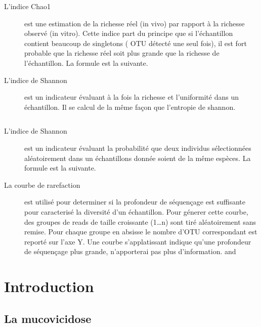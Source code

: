 \documentclass[12pt,a4paper]{article}
\begin{document}
\begin{description}
\item[L'indice Chao1] est une estimation de la richesse réel (in vivo) par rapport à la richesse observé (in vitro). Cette indice part du principe que si l’échantillon contient beaucoup de singletons ( OTU détecté une seul fois), il est fort probable que la richesse réel soit plus grande que la richesse de l’échantillon. La formule est la suivante.
\begin{equation}
\end{equation}

\item[L'indice de Shannon] est un indicateur évaluant à la fois la richesse et l’uniformité dans un échantillon. Il se calcul de la même façon que l’entropie de shannon.

\begin{equation}
\end{equation}

\item[L'indice de Shannon] est un indicateur évaluant la probabilité que deux individus sélectionnées aléatoirement dans un échantillons donnée soient de la même espèces. La formule est la suivante.

\item[La courbe de rarefaction] est utilisé pour determiner si la profondeur de séquençage est suffisante pour caracterisé la diversité d’un échantillon.
Pour génerer cette courbe, des groupes de reads de taille croissante (1…n) sont tiré aléatoirement sans remise. Pour chaque groupe en absisse le nombre d’OTU correspondant est reporté sur l’axe Y.
Une courbe s’applatissant indique qu’une profondeur de séquençage plus grande, n’apporterai pas plus d’information. \citep{Dickson2014} and \citep{Beck}

\end{description}

\setcounter{page}{1}

\section{Introduction}
\subsection{La mucovicidose}
\end{document}
